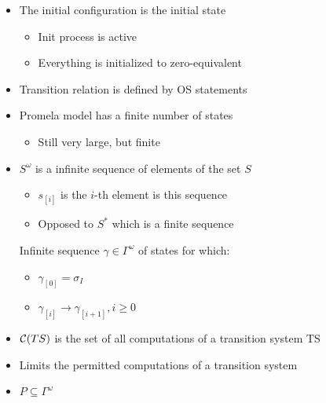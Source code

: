\begin{itemize}
\begin{itemize}
\begin{itemize}
                    \item The initial configuration is the initial state
                        \begin{itemize}
                            \item Init process is active
                            \item Everything is initialized to zero-equivalent
                        \end{itemize}
                    \item Transition relation is defined by OS statements
                    \item Promela model has a finite number of states
                        \begin{itemize}
                            \item Still very large, but finite
                        \end{itemize}
                \end{itemize}
        \end{itemize}
        \begin{itemize}
            \item $S^\omega$ is a infinite sequence of elements of the set $S$
                \begin{itemize}
                    \item $s_{[i]}$ is the $i$-th element is this sequence
                    \item Opposed to $S^*$ which is a finite sequence
                \end{itemize}
             Infinite sequence $\gamma \in \Gamma^\omega$ of states for which:
                \begin{itemize}
                    \item $\gamma_{[0]} = \sigma_I$
                    \item $\gamma_{[i]} \to \gamma_{[i+1]}, i \ge 0$
                \end{itemize}
            \item $\mathcal{C}(TS)$ is the set of all computations of a transition system TS
        \end{itemize}
        \begin{itemize}
            \item Limits the permitted computations of a transition system
            \item $P \subseteq \Gamma^\omega$

\end{itemize}
\end{itemize}
